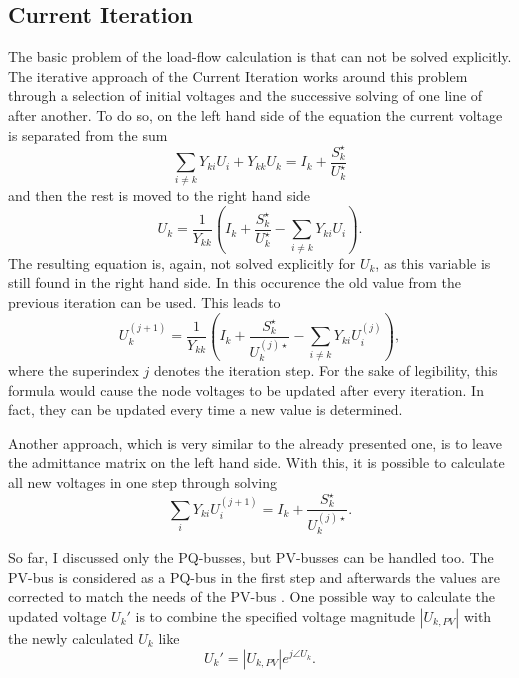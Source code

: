 \subsection{Current Iteration}
\label{sec:current_iteration}

The basic problem of the load-flow calculation is that  can not be solved explicitly. The iterative approach of the Current Iteration works around this problem through a selection of initial voltages and the successive solving of one line of  after another. To do so, on the left hand side of the equation the current voltage is separated from the sum
\begin{equation}
	\sum_{i \ne k} Y_{ki} U_i + Y_{kk} U_k = I_k + \frac{S_k^\star}{U_k^\star}
\end{equation}
and then the rest is moved to the right hand side
\begin{equation}
	 U_k = \frac{1}{Y_{kk}} \left( I_k + \frac{S_k^\star}{U_k^\star} - \sum_{i \ne k} Y_{ki} U_i \right).
\end{equation}
The resulting equation is, again, not solved explicitly for $U_k$, as this variable is still found in the right hand side. In this occurence the old value from the previous iteration can be used. This leads to
\begin{equation}
	 U_k^{(j + 1)} = \frac{1}{Y_{kk}} \left( I_k + \frac{S_k^\star}{U_k^{(j) \star}} - \sum_{i \ne k} Y_{ki} U_i^{(j)} \right),
\end{equation}
where the superindex $j$ denotes the iteration step. For the sake of legibility, this formula would cause the node voltages to be updated after every iteration. In fact, they can be updated every time a new value is determined.

Another approach, which is very similar to the already presented one, is to leave the admittance matrix on the left hand side. With this, it is possible to calculate all new voltages in one step through solving
\begin{equation}
	\sum_i Y_{ki} U_i^{(j + 1)} = I_k + \frac{S_k^\star}{U_k^{(j)\star}}.
\end{equation}

So far, I discussed only the PQ-busses, but PV-busses can be handled too. The PV-bus is considered as a PQ-bus in the first step and afterwards the values are corrected to match the needs of the PV-bus \citep[p. 211]{powerSystemAnalysis}. One possible way to calculate the updated voltage $U_k'$ is to combine the specified voltage magnitude $|U_{k,PV}|$ with the newly calculated $U_k$ like
\begin{equation}
	U_k' = |U_{k,PV}| e^{j \angle U_k}.
\end{equation}

